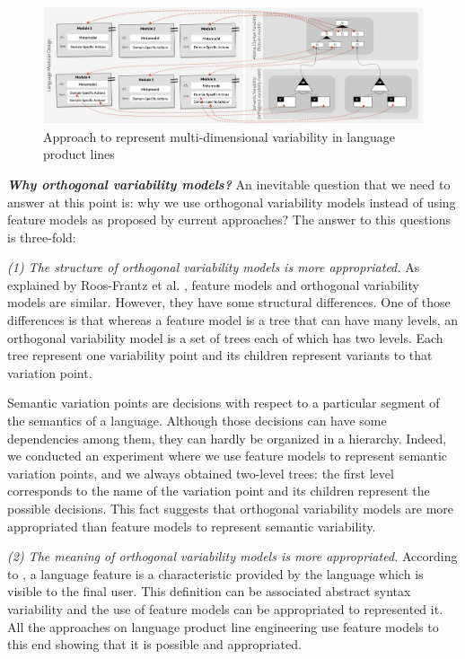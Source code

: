 \begin{figure}
  \centering\includegraphics[width=1\linewidth]{images/language-variability-fig.png}
  \caption{Approach to represent multi-dimensional variability in language product lines}
  \label{fig:languages-variability-modeling}
\end{figure}

\vspace{2mm}
\textit{\textbf{Why orthogonal variability models?}} An inevitable question that we need to answer at this point is: why we use orthogonal variability models instead of using feature models as proposed by current approaches? The answer to this questions is three-fold:

\vspace{2mm}
\textit{(1) The structure of orthogonal variability models is more appropriated.} As explained by Roos-Frantz et al. \cite{Roos-Frantz:2012}, feature models and orthogonal variability models are similar. However, they have some structural differences. One of those differences is that whereas a feature model is a tree that can have many levels, an orthogonal variability model is a set of trees each of which has two levels. Each tree represent one variability point and its children represent variants to that variation point. 

Semantic variation points are decisions with respect to a particular segment of the semantics of a language. Although those decisions can have some dependencies among them, they can hardly be organized in a hierarchy. Indeed, we conducted an experiment where we use feature models to represent semantic variation points, and we always obtained two-level trees: the first level corresponds to the name of the variation point and its children represent the possible decisions. This fact suggests that orthogonal variability models are more appropriated than feature models to represent semantic variability.  

\vspace{2mm}
\textit{(2) The meaning of orthogonal variability models is more appropriated.} According to \cite{Liebig:2013}, a language feature is a characteristic provided by the language which is visible to the final user. This definition can be associated abstract syntax variability and the use of feature models can be appropriated to represented it. All the approaches on language product line engineering use feature models to this end showing that it is possible and appropriated. 

